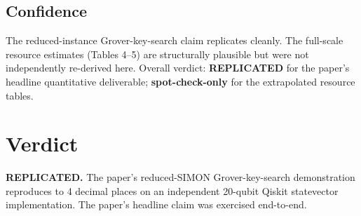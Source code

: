 \documentclass[11pt]{article}
\begin{document}
\subsection*{Confidence}

The reduced-instance Grover-key-search claim replicates cleanly. The full-scale
resource estimates (Tables 4--5) are structurally plausible but were not
independently re-derived here. Overall verdict: \textbf{REPLICATED} for the
paper's headline quantitative deliverable; \textbf{spot-check-only} for the
extrapolated resource tables.

\section{Verdict}

\textbf{REPLICATED.} The paper's reduced-SIMON Grover-key-search demonstration
reproduces to 4 decimal places on an independent 20-qubit Qiskit statevector
implementation. The paper's headline claim was exercised end-to-end.


\end{document}
